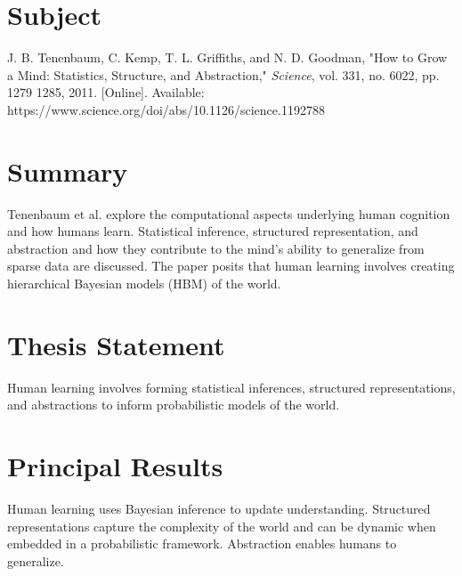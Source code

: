 \documentclass[12pt, letterpaper]{article}
\begin{document}
\pagestyle{empty}
\singlespacing
\vspace{1.0cm}

\newgeometry{} %


\section{Subject}
\label{sec:subject}
J. B. Tenenbaum, C. Kemp, T. L. Griffiths, and N. D. Goodman, "How to Grow a Mind: Statistics, Structure, and Abstraction," \emph{Science}, vol. 331, no. 6022, pp. 1279 1285, 2011. [Online]. Available: https://www.science.org/doi/abs/10.1126/science.1192788

\section{Summary}
\label{sec:summary}
Tenenbaum et al. explore the computational aspects underlying human cognition and how humans learn. Statistical inference, structured representation, and abstraction and how they contribute to the mind's ability to generalize from sparse data are discussed. The paper posits that human learning involves creating hierarchical Bayesian models (HBM) of the world.

\section{Thesis Statement}
\label{sec:thesis}
Human learning involves forming statistical inferences, structured representations, and abstractions to inform probabilistic models of the world.

\section{Principal Results}
\label{sec:principal}
Human learning uses Bayesian inference to update understanding. Structured representations capture the complexity of the world and can be dynamic when embedded in a probabilistic framework. Abstraction enables humans to generalize.
\end{document}
